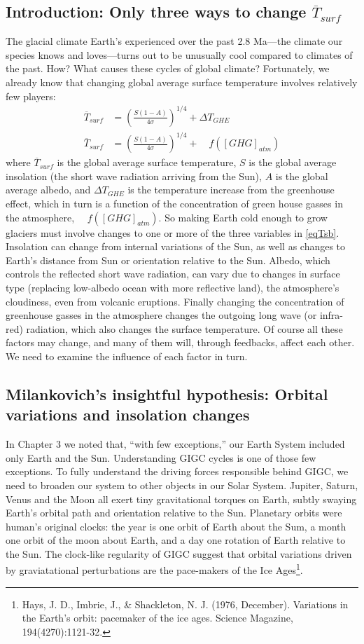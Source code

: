 \documentclass[amstex,12pt]{book}
\begin{document}
\subsection{Introduction: Only three ways to change $\overline{T}_{surf}$}
The glacial climate Earth's experienced over the past 2.8 Ma---the climate our species knows and loves---turns out to be unusually cool compared to climates of the past. How? What causes these cycles of global climate? Fortunately, we already know that changing global average surface temperature involves relatively few players:
\begin{align}
	\overline{T}_{surf}&=\left(\frac{S(1-A)}{4\sigma}\right)^{1/4}+\Delta T_{GHE} \label{eqTsa}\\
	\overline{T}_{surf}&=\left(\frac{S(1-A)}{4\sigma}\right)^{1/4}+\quad f([GHG]_{atm}) \label{eqTsb}
\end{align}
where $\overline{T}_{surf}$ is the global average surface temperature, $S$ is the global average insolation (the short wave radiation arriving from the Sun), $A$ is the global average albedo, and $\Delta T_{GHE}$ is the temperature increase from the greenhouse effect, which in turn is a function of the concentration of green house gasses in the atmosphere, $\quad f([GHG]_{atm})$. So making Earth cold enough to grow glaciers must involve changes to one or more of the three variables in \ref{eqTsb}. Insolation can change from internal variations of the Sun, as well as changes to Earth's distance from Sun or orientation relative to the Sun. Albedo, which controls the reflected short wave radiation, can vary due to changes in surface type (replacing low-albedo ocean with more reflective land), the atmosphere’s cloudiness, even from volcanic eruptions. Finally changing the concentration of greenhouse gasses in the atmosphere changes the outgoing long wave (or infra-red) radiation, which also changes the surface temperature. Of course all these factors may change, and many of them will, through feedbacks, affect each other. We need to examine the influence of each factor in turn.\\

\subsection{Milankovich's insightful hypothesis: Orbital variations and insolation changes}
In Chapter 3 we noted that, ``with few exceptions,'' our Earth System included only Earth and the Sun. Understanding GIGC cycles is one of those few exceptions. To fully understand the driving forces responsible behind GIGC, we need to broaden our system to other objects in our Solar System. Jupiter, Saturn, Venus and the Moon all exert tiny gravitational torques on Earth, subtly swaying Earth's orbital path and orientation relative to the Sun. Planetary orbits were human's original clocks: the year is one orbit of Earth about the Sum, a month one orbit of the moon about Earth, and a day one rotation of Earth relative to the Sun. The clock-like regularity of GIGC suggest that orbital variations driven by graviatational perturbations are the pace-makers of the Ice Ages\footnote{Hays, J. D., Imbrie, J., \& Shackleton, N. J. (1976, December). Variations in the Earth's orbit: pacemaker of the ice ages. Science Magazine, 194(4270):1121-32.}. 
\end{document}
